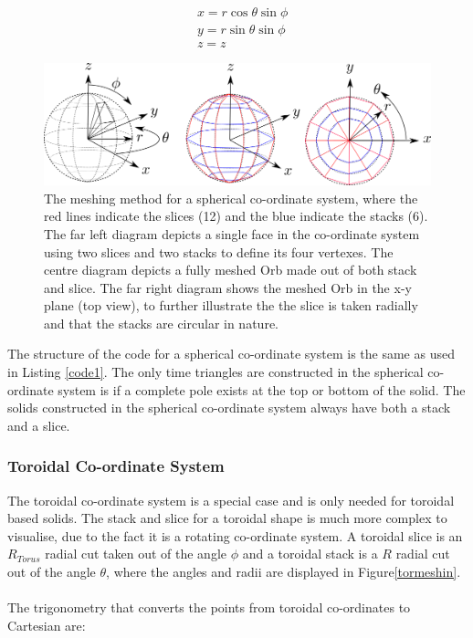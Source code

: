 \documentclass[12pt,a4paper]{article}
\begin{document}
\begin{equation}
\begin{aligned}
& x = r \cos{\theta}\sin{\phi}\\
& y = r \sin{\theta}\sin{\phi} \\
& z = z
\end{aligned}
\label{trigsph}
\end{equation}
\begin{figure}[h!]
\centering
\includegraphics[scale=0.5]{Images//Coords//sph.png}
\caption[width=\columnwidth]{The meshing method for a spherical co-ordinate system, where the red lines indicate the slices (12) and the blue indicate the stacks (6). The far left diagram depicts a single face in the co-ordinate system using two slices and two stacks to define its four vertexes. The centre diagram depicts a fully meshed Orb made out of both stack and slice. The far right diagram shows the meshed Orb in the x-y plane (top view), to further illustrate the the slice is taken radially and that the stacks are circular in nature.}
\label{sphmeshin}
\end{figure}

\noindent The structure of the code for a spherical co-ordinate system is the same as used in Listing \ref{code1}. The only time triangles are constructed in the spherical co-ordinate system is if a complete pole exists at the top or bottom of the solid. The solids constructed in the spherical co-ordinate system always have both a stack and a slice.

\newpage
\subsubsection{Toroidal Co-ordinate System}
\label{too}
The toroidal co-ordinate system is a special case and is only needed for toroidal based solids. The stack and slice for a toroidal shape is much more complex to visualise, due to the fact it is a rotating co-ordinate system. A toroidal slice is an $R_{Torus}$ radial cut taken out of the angle $\phi$ and a toroidal stack is a $R$ radial cut out of the angle $\theta$, where the angles and radii are displayed in Figure\ref{tormeshin}. 
\\\\
The trigonometry that converts the points from toroidal co-ordinates to Cartesian are:
\end{document}
